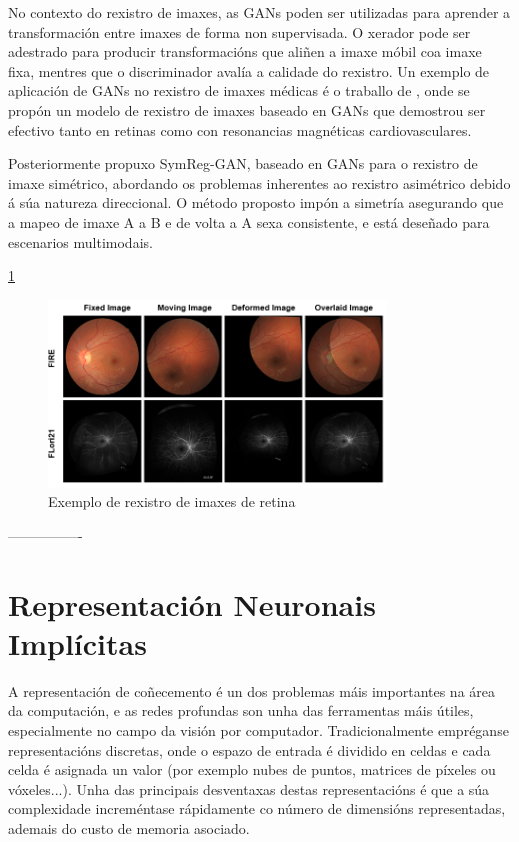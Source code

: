 No contexto do rexistro de imaxes, as GANs poden ser utilizadas para aprender a transformación entre imaxes de forma non supervisada. O xerador pode ser adestrado para producir transformacións que aliñen a imaxe móbil coa imaxe fixa, mentres que o discriminador avalía a calidade do rexistro.
Un exemplo de aplicación de GANs no rexistro de imaxes médicas é o traballo de \cite{mahapatra2019ganbasedmedicalimage}, onde se propón un modelo de rexistro de imaxes baseado en GANs que demostrou ser efectivo tanto en retinas como con resonancias magnéticas cardiovasculares.

Posteriormente \cite{gan2} propuxo SymReg-GAN, baseado en GANs para o rexistro de imaxe simétrico, abordando os problemas inherentes ao rexistro asimétrico debido á súa natureza direccional.
O método proposto impón a simetría asegurando que a mapeo de imaxe A a B e de volta a A sexa consistente, e está deseñado para escenarios multimodais.


\ref{fig:retin_reg}
\begin{figure}[hp!]
    \centering
    \includegraphics[width=0.8\textwidth]{imaxes/retin-reg.png}
    \caption{Exemplo de rexistro de imaxes de retina \cite{sivaraman2024retinaregnetzeroshotapproachretinal}}
    \label{fig:retin_reg}
\end{figure}

----------------



\section{Representación Neuronais Implícitas}
\label{sec:Representación Neuronais Implícitas}

A representación de coñecemento é un dos problemas máis importantes na área da computación, e as 
redes profundas son unha das ferramentas máis útiles, especialmente no campo da visión por computador.
Tradicionalmente empréganse representacións discretas, onde o espazo de entrada é dividido en celdas e cada celda é asignada un valor (por exemplo nubes de puntos, matrices de píxeles ou vóxeles...).
Unha das principais desventaxas destas representacións é que a súa complexidade increméntase rápidamente co número de dimensións representadas, ademais do custo de memoria asociado.

